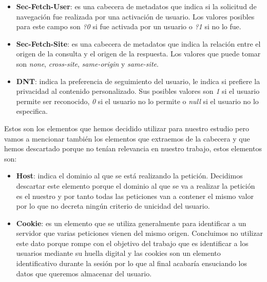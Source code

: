 \begin{itemize}
    \item \textbf{Sec-Fetch-User}: es una cabecera de metadatos que indica si la solicitud de navegación fue realizada por una activación de usuario. Los valores posibles para este campo son \textit{?0} si fue activada por un usuario o \textit{?1} si no lo fue.
    \item \textbf{Sec-Fetch-Site}: es una cabecera de metadatos que indica la relación entre el origen de la consulta y el origen de la respuesta. Los valores que puede tomar son \textit{none}, \textit{cross-site}, \textit{same-origin} y \textit{same-site}.
    \item \textbf{DNT}: indica la preferencia de seguimiento del usuario, le indica si prefiere la privacidad al contenido personalizado. Sus posibles valores son \textit{1} si el usuario permite ser reconocido, \textit{0} si el usuario no lo permite o \textit{null} si el usuario no lo especifica.
\end{itemize}
Estos son los elementos que hemos decidido utilizar para nuestro estudio pero vamos a mencionar también los elementos que extraemos de la cabecera y que hemos descartado porque no tenían relevancia en nuestro trabajo, estos elementos son:
\begin{itemize}
    \item \textbf{Host}: indica el dominio al que se está realizando la petición. Decidimos descartar este elemento porque el dominio al que se va a realizar la petición es el nuestro y por tanto todas las peticiones van a contener el mismo valor por lo que no decreta ningún criterio de unicidad del usuario.
    \item \textbf{Cookie}: es un elemento que se utiliza generalmente para identificar a un servidor que varias peticiones vienen del mismo origen. Concluimos no utilizar este dato porque rompe con el objetivo del trabajo que es identificar a los usuarios mediante su huella digital y las cookies son un elemento identificativo durante la sesión por lo que al final acabaría ensuciando los datos que queremos almacenar del usuario.
\end{itemize}

